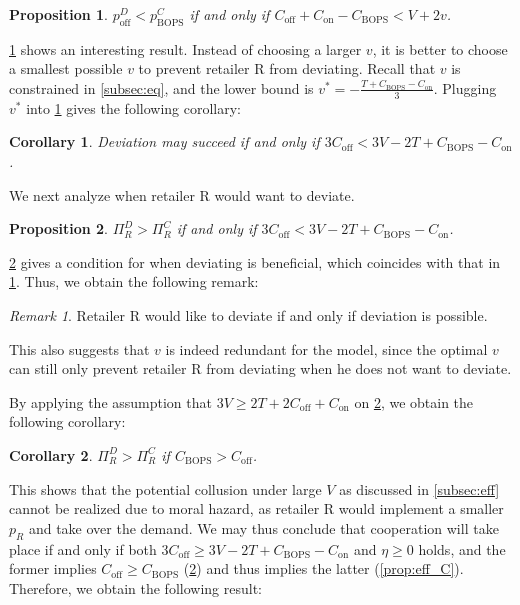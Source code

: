 \documentclass[a4paper]{article}
\theoremstyle{definition}
\theoremstyle{plain}
\newtheorem{proposition}{Proposition}
\newtheorem{corollary}{Corollary}
\theoremstyle{remark}
\newtheorem*{remark}{Remark}
\newcommand{\on}{\mathrm{on}}
\newcommand{\off}{\mathrm{off}}
\newcommand{\BOPS}{\mathrm{BOPS}}
\begin{document}
\begin{proposition}\label{prop:dev_v}
    $p_{\off}^D<p_{\BOPS}^C$ if and only if $C_{\off}+C_{\on}-C_{\BOPS}<V+2v$.
\end{proposition}

\cref{prop:dev_v} shows an interesting result.
Instead of choosing a larger $v$,
it is better to choose a smallest possible $v$ to prevent retailer R from deviating.
Recall that $v$ is constrained in \cref{subsec:eq},
and the lower bound is $v^*=-\tfrac{T+C_{\BOPS}-C_{\on}}{3}$.
Plugging $v^*$ into \cref{prop:dev_v} gives the following corollary:

\begin{corollary}
    Deviation may succeed if and only if $3C_{\off}<3V-2T+C_{\BOPS}-C_{\on}$.
\end{corollary}

We next analyze when retailer R would want to deviate.

\begin{proposition}\label{prop:dev_pi}
    $\Pi_R^D>\Pi_R^C$ if and only if $3C_{\off}<3V-2T+C_{\BOPS}-C_{\on}$.
\end{proposition}

\cref{prop:dev_pi} gives a condition for when deviating is beneficial,
which coincides with that in \cref{prop:dev_v}.
Thus,
we obtain the following remark:

\begin{remark}
    Retailer R would like to deviate if and only if deviation is possible.
\end{remark}

This also suggests that $v$ is indeed redundant for the model,
since the optimal $v$ can still only prevent retailer R from deviating when he does not want to deviate.

By applying the assumption that $3V\geq 2T+2C_{\off}+C_{\on}$ on \cref{prop:dev_pi},
we obtain the following corollary:

\begin{corollary}\label{cor:dev_C}
    $\Pi_R^D>\Pi_R^C$ if $C_{\BOPS}>C_{\off}$.
\end{corollary}

This shows that the potential collusion under large $V$ as discussed in \cref{subsec:eff} cannot be realized due to moral hazard,
as retailer R would implement a smaller $p_R$ and take over the demand.
We may thus conclude that cooperation will take place if and only if both $3C_{\off}\geq 3V-2T+C_{\BOPS}-C_{\on}$ and $\eta\geq 0$ holds,
and the former implies $C_{\off}\geq C_{\BOPS}$ (\cref{cor:dev_C}) and thus implies the latter (\cref{prop:eff_C}).
Therefore,
we obtain the following result:
\end{document}
